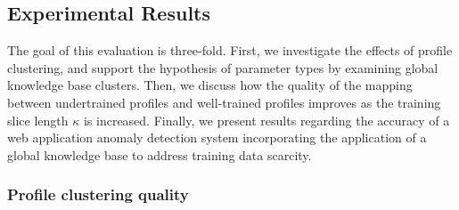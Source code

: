 \subsection{Experimental Results}
\label{web:longtail:eval}
The goal of this evaluation is three-fold.  First, we investigate the
effects of profile clustering, and support the hypothesis of parameter
types by examining global knowledge base clusters.  Then, we discuss
how the quality of the mapping between undertrained profiles and
well-trained profiles improves as the training slice length $\kappa$
is increased.  Finally, we present results regarding the accuracy of a
web application anomaly detection system incorporating the application
of a global knowledge base to address training data scarcity.

\subsubsection{Profile clustering quality}
\label{web:longtail:eval:clustering}

